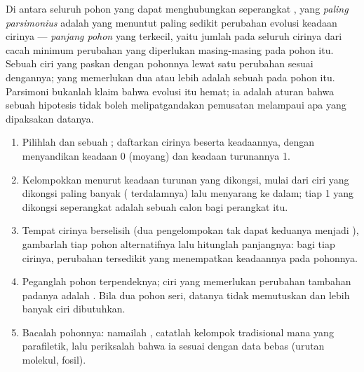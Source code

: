 \begin{definition}[Parsimoni]\label{def:b1:classifying-biodiversity:parsimony}
Di antara seluruh pohon yang dapat menghubungkan seperangkat ,
yang \emph{paling parsimonius} adalah yang menuntut paling sedikit
perubahan evolusi keadaan cirinya --- \emph{panjang pohon} yang
terkecil, yaitu jumlah pada seluruh cirinya dari cacah minimum
perubahan yang diperlukan masing-masing pada pohon itu. Sebuah ciri
yang paskan dengan pohonnya lewat satu perubahan sesuai dengannya;
yang memerlukan dua atau lebih adalah sebuah  pada pohon itu.
Parsimoni bukanlah klaim bahwa evolusi itu hemat; ia adalah aturan
bahwa sebuah hipotesis tidak boleh melipatgandakan pemusatan melampaui
apa yang dipaksakan datanya.
\end{definition}

\begin{method}\label{met:b1:classifying-biodiversity:cladogram}
\begin{enumerate}
  \item Pilihlah  dan sebuah ; daftarkan cirinya
        beserta keadaannya, dengan menyandikan keadaan  0 (moyang) dan keadaan turunannya 1.
  \item Kelompokkan  menurut keadaan turunan yang dikongsi,
        mulai dari ciri yang dikongsi paling banyak  (
        terdalamnya) lalu menyarang ke dalam; tiap 1 yang dikongsi
        seperangkat  adalah sebuah calon  bagi
        perangkat itu.
  \item Tempat cirinya berselisih (dua pengelompokan tak dapat
        keduanya menjadi ), gambarlah tiap pohon alternatifnya
        lalu hitunglah panjangnya: bagi tiap cirinya, perubahan
        tersedikit yang menempatkan keadaannya pada pohonnya.
  \item Peganglah pohon terpendeknya; ciri yang memerlukan perubahan
        tambahan padanya adalah . Bila dua pohon seri,
        datanya tidak memutuskan dan lebih banyak ciri dibutuhkan.
  \item Bacalah pohonnya: namailah , catatlah kelompok
        tradisional mana yang parafiletik, lalu periksalah bahwa ia
        sesuai dengan data bebas (urutan molekul, fosil).
\end{enumerate}
\end{method}

